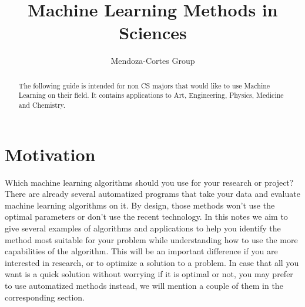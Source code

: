 \documentclass[11pt,letterpaper]{report}
\author{Mendoza-Cortes Group}
\title{Machine Learning Methods in Sciences}
\begin{document}
	
	\setcounter{page}{1}
	\thispagestyle{empty}
	
	
	
	
	\maketitle
	
	\clearpage
	\newpage
	\setcounter{page}{1}
	\pagestyle{fancy}
	
	
	
	
	\begin{abstract}
		The following guide is intended for non CS majors that would like to use  Machine Learning on their field. It contains applications to Art, Engineering, Physics, Medicine and Chemistry.
	\end{abstract}
	
	\clearpage
	\newpage
	\section{Motivation}
		Which machine learning algorithms should you use for your research or project? There are already several automatized programs  that take your data and evaluate machine learning algorithms on it. By design, those methods won't use the optimal parameters or don't use the recent technology. In this notes we aim to give several examples of algorithms and applications to help you identify the method most suitable for your problem while understanding how to use the more capabilities of the algorithm. This will be an important difference if you are interested in research, or to optimize a solution to a problem. In case that all you want is a quick solution without worrying if it is optimal or not, you may prefer to use automatized methods instead, we will mention a couple of them in the corresponding section. 
		
\end{document}
